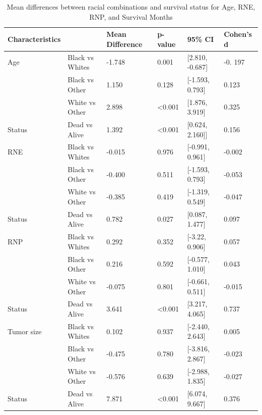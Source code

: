 \documentclass[times,sort&compress,3p]{elsarticle}
\theoremstyle{plain}
\theoremstyle{definition}
\begin{document}
\begin{table}[H]
\centering
\caption{Mean differences between racial combinations and survival status for Age, RNE, RNP, and Survival Months}
\label{table4}
\begin{tabular}{llllll} \hline \hline
Characteristics &                 & Mean Difference & p-value          & 95\% CI               & Cohen’s d \\ \hline 
Age             & Black vs Whites & -1.748          & 0.001            & {[}2.810, -0.687{]}   & -0. 197   \\
                & Black vs Other  & 1.150           & 0.128            & {[}-1.593, 0.793{]}   & 0.123     \\
                & White vs Other  & 2.898           & \textless{}0.001 & {[}1.876, 3.919{]}    & 0.325     \\
Status          & Dead vs   Alive & 1.392           & \textless 0.001  & {[}0.624, 2.160{]}{]} & 0.156     \\ \hline
RNE             & Black vs Whites & -0.015          & 0.976            & {[}-0.991, 0.961{]}   & -0.002    \\
                & Black vs Other  & -0.400          & 0.511            & {[}-1.593, 0.793{]}   & -0.053    \\
                & White vs Other  & -0.385          & 0.419            & {[}-1.319, 0.549{]}   & -0.047    \\ 
Status          & Dead vs   Alive & 0.782           & 0.027            & {[}0.087, 1.477{]}    & 0.097     \\  \hline
RNP             & Black vs Whites & 0.292           & 0.352            & {[}-3.22, 0.906{]}    & 0.057     \\
                & Black vs Other  & 0.216           & 0.592            & {[}-0.577, 1.010{]}   & 0.043     \\
                & White vs Other  & -0.075          & 0.801            & {[}-0.661, 0.511{]}   & -0.015    \\
Status          & Dead vs   Alive & 3.641           & \textless 0.001  & {[}3.217, 4.065{]}    & 0.737     \\ \hline
Tumor size      & Black vs Whites & 0.102           & 0.937            & {[}-2.440, 2.643{]}   & 0.005     \\
                & Black vs Other  & -0.475          & 0.780            & {[}-3.816, 2.867{]}   & -0.023    \\
                & White vs Other  & -0.576          & 0.639            & {[}-2.988, 1.835{]}   & -0.027    \\
Status          & Dead vs   Alive & 7.871           & \textless{}0.001 & {[}6.074, 9.667{]}    & 0.376   \\  \hline \hline
\end{tabular} 
\end{table}
\end{document}
